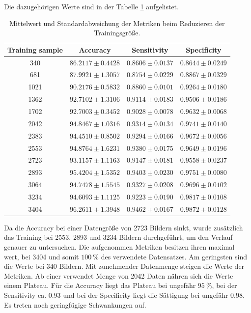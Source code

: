 Die dazugehörigen Werte sind in der Tabelle \ref{tab:reduzierung_trainingsdaten} aufgelistet.
\begin{table}[htbp]
    \centering
        \begin{tabular}{cccc}
            \toprule
            Training sample & Accuracy & Sensitivity & Specificity\\
            \midrule
            340  & $86.2117 \pm 0.4428$ & $0.8606 \pm 0.0137 $ & $0.8644 \pm 0.0249$\\
            681  & $87.9921 \pm 1.3057$ & $0.8754 \pm 0.0229 $ & $0.8867 \pm 0.0329$\\
            1021 & $90.2176 \pm 0.5832$ & $0.8860 \pm 0.0101 $ & $0.9264 \pm 0.0180$\\
            1362 & $92.7102 \pm 1.3106$ & $0.9114 \pm 0.0183 $ & $0.9506 \pm 0.0186$\\
            1702 & $92.7003 \pm 0.3452$ & $0.9028 \pm 0.0078 $ & $0.9632 \pm 0.0068$\\
            2042 & $94.8467 \pm 1.0316$ & $0.9314 \pm 0.0134 $ & $0.9741 \pm 0.0140$\\
            2383 & $94.4510 \pm 0.8502$ & $0.9294 \pm 0.0166 $ & $0.9672 \pm 0.0056$\\
            2553 & $94.8764 \pm 1.6231$ & $0.9380 \pm 0.0175 $ & $0.9649 \pm 0.0196$\\
            2723 & $93.1157 \pm 1.1163$ & $0.9147 \pm 0.0181 $ & $0.9558 \pm 0.0237$\\
            2893 & $95.4204 \pm 1.5352$ & $0.9403 \pm 0.0230 $ & $0.9751 \pm 0.0080$\\
            3064 & $94.7478 \pm 1.5545$ & $0.9327 \pm 0.0208 $ & $0.9696 \pm 0.0102$\\
            3234 & $94.6093 \pm 1.1125$ & $0.9223 \pm 0.0190 $ & $0.9817 \pm 0.0108$\\
            3404 & $96.2611 \pm 1.3948$ & $0.9462 \pm 0.0167 $ & $0.9872 \pm 0.0128$\\ 
            \bottomrule
        \end{tabular}
  \caption{Mittelwert und Standardabweichung der Metriken beim Reduzieren der Trainingsgröße.}
  \label{tab:reduzierung_trainingsdaten}
\end{table}
Da die Accuracy bei einer Datengröße von 2723 Bildern sinkt, wurde zusätzlich das Training bei 
2553, 2893 und 3234 Bildern durchgeführt, um den Verlauf genauer zu untersuchen.
Die aufgenommen Metriken besitzen ihren maximal wert, bei 3404 und somit $\qty{100}{\%}$ des verwendete Datensatzes.
Am geringsten sind die Werte bei 340 Bildern.
Mit zunehmender Datenmenge steigen die Werte der Metriken.
Ab einer verwendet Menge von 2042 Daten nähren sich die Werte einem Plateau.
Für die Accuracy liegt das Plateau bei ungefähr $\qty{95}{\%}$, bei der Sensitivity ca. $0.93$ und bei der Specificity liegt die Sättigung bei ungefähr $0.98$. 
Es treten noch geringfügige Schwankungen auf.

